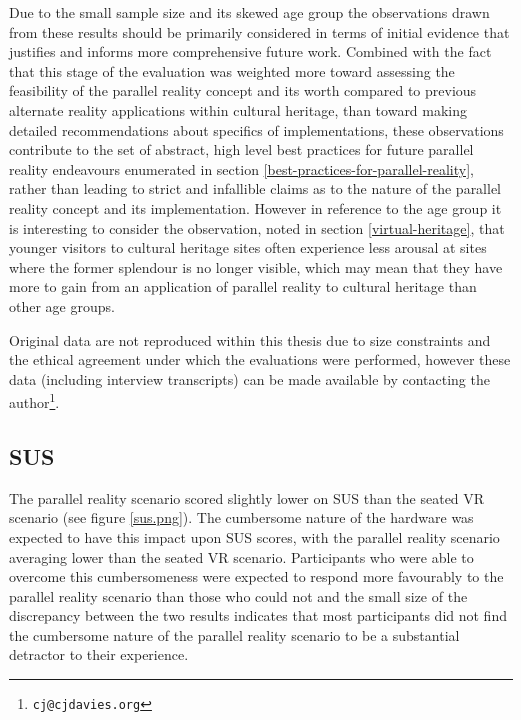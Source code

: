 Due to the small sample size and its skewed age group the observations drawn from these results should be primarily considered in terms of initial evidence that justifies and informs more comprehensive future work. Combined with the fact that this stage of the evaluation was weighted more toward assessing the feasibility of the parallel reality concept and its worth compared to previous alternate reality applications within cultural heritage, than toward making detailed recommendations about specifics of implementations, these observations contribute to the set of abstract, high level best practices for future parallel reality endeavours enumerated in section \ref{best-practices-for-parallel-reality}, rather than leading to strict and infallible claims as to the nature of the parallel reality concept and its implementation. However in reference to the age group it is interesting to consider the observation, noted in section \ref{virtual-heritage}, that younger visitors to cultural heritage sites often experience less arousal at sites where the former splendour is no longer visible, which may mean that they have more to gain from an application of parallel reality to cultural heritage than other age groups.

Original data are not reproduced within this thesis due to size constraints and the ethical agreement under which the evaluations were performed, however these data (including interview transcripts) can be made available by contacting the author\footnote{\texttt{cj@cjdavies.org}}.


\subsection{SUS}
The parallel reality scenario scored slightly lower on SUS than the seated VR scenario (see figure \ref{sus.png}). The cumbersome nature of the hardware was expected to have this impact upon SUS scores, with the parallel reality scenario averaging lower than the seated VR scenario. Participants who were able to overcome this cumbersomeness were expected to respond more favourably to the parallel reality scenario than those who could not and the small size of the discrepancy between the two results indicates that most participants did not find the cumbersome nature of the parallel reality scenario to be a substantial detractor to their experience.

